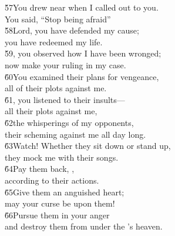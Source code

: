 \begin{poetry}
\poeml \v{57}You drew near when I called out to you. \\
\poemll    You said, ``Stop being afraid'' \\
\poeml \v{58}Lord, you have defended my cause; \\
\poemll    you have redeemed my life. \\
\poeml \v{59}, you observed how I have been wronged; \\
\poemll    now make your ruling in my case. \\
\poeml \v{60}You examined their plans for vengeance, \\
\poemll    all of their plots against me. \\
\poeml \v{61}, you listened to their insults--- \\
\poemll    all their plots against me, \\
\poeml \v{62}the whisperings of my opponents, \\
\poemll    their scheming against me all day long. \\
\poeml \v{63}Watch! Whether they sit down or stand up, \\
\poemll    they mock me with their songs. \\
\poeml \v{64}Pay them back, , \\
\poemll    according to their actions. \\
\poeml \v{65}Give them an anguished heart; \\
\poemll    may your curse be upon them! \\
\poeml \v{66}Pursue them in your anger \\
\poemll    and destroy them from under the 's heaven.
\end{poetry}

